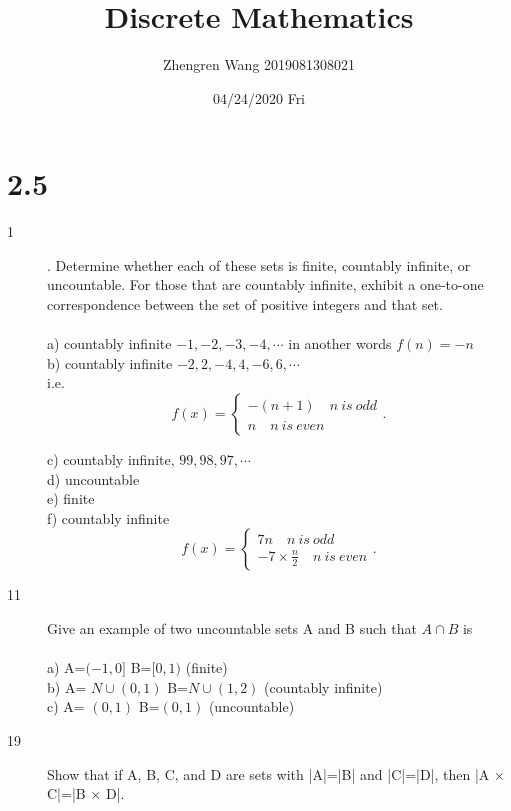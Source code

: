 \documentclass[UTF8]{article}
\title{Discrete Mathematics}
\author{Zhengren Wang 2019081308021}
\date{04/24/2020 Fri }
\begin{document}
\maketitle 

\part{2.5}
\begin{description}
    \item[1]. Determine whether each of these sets is finite, countably infinite, or uncountable. For those that are countably infinite, exhibit a one-to-one correspondence between the set of positive integers and that set. \\\\
        a) countably infinite   $-1,-2,-3,-4,\cdots$   \quad  in another words $f(n)=-n$ \\
        b) countably infinite   $-2,2,-4,4,-6,6,\cdots$    \\
        i.e.\[
            f(x)=\begin{cases} -(n+1) \quad n\ is\ odd \\
            n \quad n\ is\ even 
            \end{cases}
        .\] 

        c) countably infinite, $99, 98, 97,\cdots$\\
        d) uncountable\\
        e) finite \\
        f) countably infinite \\
        \[
        f(x)= \begin{cases}
            7n \quad n \ is \ odd  \\
            -7 \times \frac{n}{2} \quad n \  is \ even
        \end{cases}
        .\] 

    \item[11]Give an example of two uncountable sets A and B such that $A\cap B$ is \\\\ 
        a) A=$(-1,0]$ B=$[0,1)$  \quad (finite)  \\    
        b) A=  $N \cup (0,1)$ B=$N \cup (1,2)$   \quad (countably infinite)\\
        c) A= $(0,1)$ B=$(0,1)$ \quad (uncountable)\\

    \item[19]Show that if A, B, C, and D are sets with |A|=|B| and |C|=|D|, then |A × C|=|B × D|. \\\\


\end{description}
\end{document}
